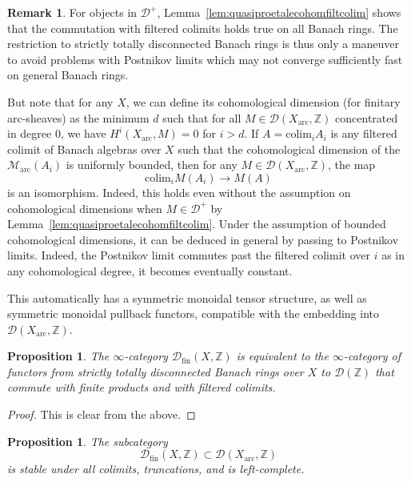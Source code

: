 \documentclass[11pt]{amsart}
\numberwithin{equation}{section}
\numberwithin{theorem}{section}
\newtheorem{proposition}[theorem]{Proposition}
\theoremstyle{definition}
\newtheorem{remark}[theorem]{Remark}
\begin{document}
\begin{remark} For objects in $\mathcal D^+$, Lemma~\ref{lem:quasiproetalecohomfiltcolim} shows that the commutation with filtered colimits holds true on all Banach rings. The restriction to strictly totally disconnected Banach rings is thus only a maneuver to avoid problems with Postnikov limits which may not converge sufficiently fast on general Banach rings.

But note that for any $X$, we can define its cohomological dimension (for finitary arc-sheaves) as the minimum $d$ such that for all $M\in \mathcal D(X_{\mathrm{arc}},\mathbb Z)$ concentrated in degree $0$, we have $H^i(X_{\mathrm{arc}},M)=0$ for $i>d$. If $A=\mathrm{colim}_i A_i$ is any filtered colimit of Banach algebras over $X$ such that the cohomological dimension of the $\mathcal M_{\mathrm{arc}}(A_i)$ is uniformly bounded, then for any $M\in \mathcal D(X_{\mathrm{arc}},\mathbb Z)$, the map
\[
\mathrm{colim}_i M(A_i)\to M(A)
\]
is an isomorphism. Indeed, this holds even without the assumption on cohomological dimensions when $M\in \mathcal D^+$ by Lemma~\ref{lem:quasiproetalecohomfiltcolim}. Under the assumption of bounded cohomological dimensions, it can be deduced in general by passing to Postnikov limits. Indeed, the Postnikov limit commutes past the filtered colimit over $i$ as in any cohomological degree, it becomes eventually constant.
\end{remark}

This automatically has a symmetric monoidal tensor structure, as well as symmetric monoidal pullback functors, compatible with the embedding into $\mathcal D(X_{\mathrm{arc}},\mathbb Z)$.

\begin{proposition} The $\infty$-category $\mathcal D_{\mathrm{fin}}(X,\mathbb Z)$ is equivalent to the $\infty$-category of functors from strictly totally disconnected Banach rings over $X$ to $\mathcal D(\mathbb Z)$ that commute with finite products and with filtered colimits.
\end{proposition}

\begin{proof} This is clear from the above.
\end{proof}

\begin{proposition} The subcategory
\[
\mathcal D_{\mathrm{fin}}(X,\mathbb Z)\subset \mathcal D(X_{\mathrm{arc}},\mathbb Z)
\]
is stable under all colimits, truncations, and is left-complete.
\end{proposition}
\end{document}

